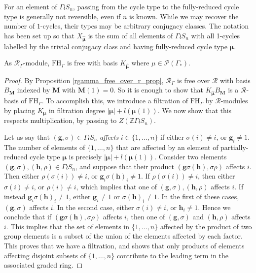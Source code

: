 \documentclass[ALCO,Unicode]{cedram}
\newcommand{\bs}{\boldsymbol}
\newcommand{\RGamma}{\mathcal{R}_{\Gamma}}
\newcommand{\FHG}{\mathrm{FH}_{\Gamma}}
\newcommand{\RGamma}{\mathcal{R}_{\Gamma}}
\newcommand{\FHG}{\mathrm{FH}_{\Gamma}}
\begin{document}
For an element of $\Gamma \wr S_n$, passing from the cycle type to the fully-reduced cycle type is generally not reversible, even if $n$ is known. While we may recover the number of $1$-cycles, their types may be arbitrary conjugacy classes. The notation has been set up so that $X_{\bm\hat{\bs \mu}}$ is the sum of all elements of $\Gamma \wr S_n$ with all 1-cycles labelled by the trivial conjugacy class and having fully-reduced cycle type $\bs \mu$.

\begin{theorem}
As $\RGamma$-module, $\FHG$ is free with basis $K_{\bm \hat{\bs \mu}}$ where $\mu \in \mathcal{P}(\Gamma_*)$.
\end{theorem}
\begin{proof}
By Proposition \ref{rgamma_free_over_r_prop}, $\RGamma$ is free over $\mathcal{R}$ with basis $B_{\mathbf{M}}$ indexed by $\mathbf{M}$ with $\mathbf{M}(1) = 0$. So it is enough to show that $K_{\bm\hat{\bs\mu}}B_{\mathbf{M}}$ is a $\mathcal{R}$-basis of $\FHG$. To accomplish this, we introduce a filtration of $\FHG$ by $\mathcal{R}$-modules by placing $K_{\bs \mu}$ in filtration degree $|\bs \mu| + l(\bs\mu(1))$. We now show that this respects multiplication, by passing to $Z(\mathbb{Z} \Gamma \wr S_n)$.

Let us say that $(\mathbf{g}, \sigma) \in \Gamma \wr S_n$ \emph{affects} $i \in \{1,\ldots, n\}$ if either $\sigma(i) \neq i$, or $\mathbf{g}_i \neq 1$. The number of elements of $\{1,\ldots,n\}$ that are affected by an element of partially-reduced cycle type $\bs \mu$ is precisely $|\bs \mu| + l(\bs\mu(1))$. Consider two elements $(\mathbf{g}, \sigma), (\mathbf{h}, \rho) \in \Gamma \wr S_n$, and suppose that their product $(\mathbf{g} \sigma(\mathbf{h}), \sigma \rho)$ affects $i$. Then either $\rho(\sigma(i)) \neq i$, or $\mathbf{g}_i\sigma(\mathbf{h})_i \neq 1$. If $\rho(\sigma(i)) \neq i$, then either $\sigma(i) \neq i$, or $\rho(i) \neq i$, which implies that one of $(\mathbf{g}, \sigma), (\mathbf{h}, \rho)$ affects $i$. If instead $\mathbf{g}_i\sigma(\mathbf{h})_i \neq 1$, either $\mathbf{g}_i \neq 1$ or $\sigma(\mathbf{h})_i \neq 1$. In the first of these cases, $(\mathbf{g}, \sigma)$ affects $i$. In the second case, either $\sigma(i) \neq i$, or $\mathbf{h}_i \neq 1$. Hence we conclude that if $(\mathbf{g} \sigma(\mathbf{h}), \sigma \rho)$ affects $i$, then one of $(\mathbf{g}, \sigma)$ and $(\mathbf{h}, \rho)$ affects $i$. This implies that the set of elements in $\{1,\ldots,n\}$ affected by the product of two group elements is a subset of the union of the elements affected by each factor. This proves that we have a filtration, and shows that only products of elements affecting disjoint subsets of $\{1,\ldots,n\}$ contribute to the leading term in the associated graded ring.


\end{proof}
\end{document}

